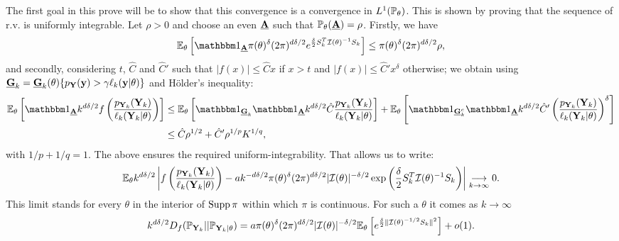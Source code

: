 \begin{proofb}
The first goal in this prove will be to show that this convergence  is a convergence in $L^1(\mathbb{P}_\theta)$. This is shown by proving that the sequence of r.v. is uniformly integrable. 
Let $\rho>0$ and choose an even $\underline{\mathbf{A}}$ such that $\mathbb{P}_\theta(\underline{\mathbf{A}})=\rho$. %
Firstly, we have 
    \begin{equation}
        \EE_\theta\left[\indic_{\ubf A} \pi(\theta)^\delta(2\pi)^{d\delta/2}e^{\frac{\delta}{2}S_k^T\cI(\theta)^{-1}S_k}\right]  
        \leq \pi(\theta)^\delta(2\pi)^{d\delta/2} \rho,
    \end{equation}
and secondly,
considering  $t$,  $\hat C$ and $\hat C'$ such that $|f(x)|\leq\hat Cx$ if $x>t$ and $|f(x)|\leq \hat C'x^\delta$ otherwise; we obtain using 
$\underline{\mathbf{G}}_k= \underline{\mathbf{G}}_k(\theta)\{p_{\mathbf{Y}}(\mathbf{y})>\gamma\ell_k(\mathbf{y}|\theta)\}$ and Hölder's inequality:
    \begin{align}
 \EE_\theta\left[ \indic_{\ubf A}k^{d\delta/2}f\left( \frac{p_{\mbf Y_k}(\mbf Y_k)}{\ell_k(\mbf Y_k|\theta)}\right) \right]
%    
\nonumber                  
    &\leq \EE_\theta\left[ \indic_{\ubf G_k}\indic_{\ubf A} k^{d\delta/2} \hat C  \frac{p_{\mbf Y_k}(\mbf Y_k)}{\ell_k(\mbf Y_k|\theta)} \right] + \EE_\theta\left[ \indic_{\ubf G_k^c}\indic_{\ubf A}k^{d\delta/2}\hat C'\left( \frac{p_{\mbf Y_k}(\mbf Y_k)}{\ell_k(\mbf Y_k|\theta)}\right)^\delta \right] \\
                & \leq \hat C\rho^{1/2}  + \hat C' \rho^{1/p} K^{1/q} , %
\end{align}
with $1/p+1/q=1$.
The above ensures the required uniform-integrability. %
That allows us to write:
    \begin{equation}
        \mathbb{E}_\theta k^{d\delta/2}\left|f\left(\frac{p_{\mathbf{Y}_k}(\mathbf{Y}_k)}{\ell_k(\mathbf{Y}_k|\theta)}\right)  - a k^{-d\delta/2}\pi(\theta)^\delta(2\pi)^{d\delta/2}|\mathcal{I}(\theta)|^{-\delta/2}\exp\left(\frac{\delta}{2} S_k^T\mathcal{I}(\theta)^{-1}S_k \right)  \right|
        \overset{\ }{\underset{k\rightarrow\infty}{\longrightarrow}}0.
    \end{equation}
This limit stands for every $\theta$ in the interior of $\operatorname{Supp}\pi$ within which $\pi$ is continuous. For such a $\theta$ it comes as $k\rightarrow\infty$
\begin{align}
    k^{d\delta/2} D_f(\PP_{\mbf Y_k} || \PP_{\mbf Y_k|\theta}) = a\pi(\theta)^\delta(2\pi)^{d\delta/2}|\cI(\theta)|^{-\delta/2}\EE_\theta\left[e^{\frac{\delta}{2} \|\cI(\theta)^{-1/2}S_k\|^2}\right] + o(1).  

\end{align}
\end{proofb}
